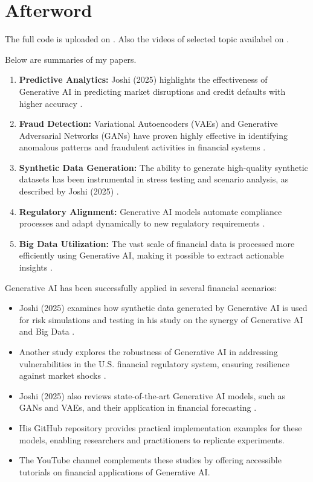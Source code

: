 \documentclass[a4paper,12pt]{scrbook}
\begin{document}
	
	
	\chapter*{Afterword}
	
	
	The full code is uploaded on \cite{JoshiGit2025}.
	Also the videos of selected topic availabel on \cite{JoshiYouTube2025}.
	
Below are summaries of my papers.

	\begin{enumerate}
		\item \textbf{Predictive Analytics:} Joshi (2025) highlights the effectiveness of Generative AI in predicting market disruptions and credit defaults with higher accuracy \cite{JoshiIJFMR2025}.
		\item \textbf{Fraud Detection:} Variational Autoencoders (VAEs) and Generative Adversarial Networks (GANs) have proven highly effective in identifying anomalous patterns and fraudulent activities in financial systems \cite{JoshiCSEIT2025}.
		\item \textbf{Synthetic Data Generation:} The ability to generate high-quality synthetic datasets has been instrumental in stress testing and scenario analysis, as described by Joshi (2025) \cite{JoshiIJIREM2025}.
		\item \textbf{Regulatory Alignment:} Generative AI models automate compliance processes and adapt dynamically to new regulatory requirements \cite{JoshiIJIREM2025}.
		\item \textbf{Big Data Utilization:} The vast scale of financial data is processed more efficiently using Generative AI, making it possible to extract actionable insights \cite{JoshiIJIREM2025}.
	\end{enumerate}
	
	Generative AI has been successfully applied in several financial scenarios:
	\begin{itemize}
		\item Joshi (2025) examines how synthetic data generated by Generative AI is used for risk simulations and testing in his study on the synergy of Generative AI and Big Data \cite{JoshiIJFMR2025}.
		\item Another study explores the robustness of Generative AI in addressing vulnerabilities in the U.S. financial regulatory system, ensuring resilience against market shocks \cite{JoshiIJIREM2025}.
		\item Joshi (2025) also reviews state-of-the-art Generative AI models, such as GANs and VAEs, and their application in financial forecasting \cite{JoshiCSEIT2025}.
		\item His GitHub repository \cite{JoshiGit2025} provides practical implementation examples for these models, enabling researchers and practitioners to replicate experiments.
		\item The YouTube channel \cite{JoshiYouTube2025} complements these studies by offering accessible tutorials on financial applications of Generative AI.
	\end{itemize}
	
\end{document}
